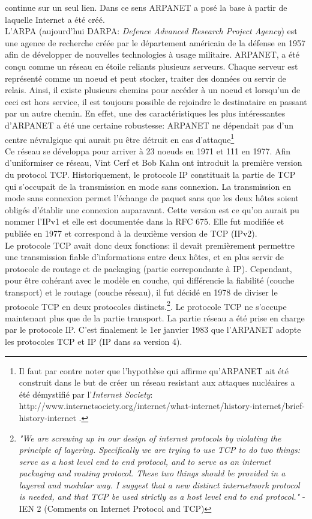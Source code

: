 continue sur un seul lien. Dans ce sens ARPANET a posé la base à partir de 
laquelle Internet a été créé. 
\\
L'ARPA (aujourd'hui DARPA: {\it Defence Advanced Research Project Agency}) est
une agence de recherche créée par le département américain de la défense en
1957 afin de développer de nouvelles technologies à usage militaire. ARPANET,
a été conçu comme un réseau en étoile reliants plusieurs serveurs.
Chaque serveur est représenté comme un noeud et peut stocker, traiter des données ou servir de relais.
Ainsi, il existe plusieurs chemins pour accéder à un noeud et lorsqu'un de ceci
est hors service, il est toujours possible de rejoindre le destinataire
en passant par un autre chemin. En effet, une des caractéristiques les plus intéressantes
d'ARPANET a été une certaine robustesse: ARPANET ne dépendait pas d'un centre
névralgique qui aurait pu être détruit en cas d'attaque\footnote { Il faut par
contre noter que l'hypothèse qui affirme qu'ARPANET ait été construit dans le
but de créer un réseau resistant aux attaques nucléaires a été démystifié par
l'{\it Internet Society}:
http://www.internetsociety.org/internet/what-internet/history-internet/brief-history-internet
.}
\\
Ce réseau se développa pour arriver à 23 noeuds en 1971 et 111 en 1977.
Afin d'uniformiser ce réseau, Vint Cerf et Bob Kahn ont introduit la première
version du protocol TCP.  Historiquement, le protocole IP constituait la
partie de TCP qui s'occupait de la transmission en mode sans connexion.
La transmission en mode sans connexion permet l'échange de paquet sans que les
deux hôtes soient obligés d'établir une connexion auparavant.
Cette version est ce qu'on aurait pu nommer l'IPv1 et elle est documentée dans
la RFC 675. Elle fut modifiée et publiée en 1977 et correspond à la
deuxième version de TCP (IPv2). 
\\
Le protocole TCP avait donc deux fonctions: il devait premièrement
permettre une transmission fiable d'informations entre deux hôtes, et en plus
servir de protocole de routage et de packaging (partie correpondante à IP).
Cependant, pour être cohérant avec le modèle en couche, qui différencie la fiabilité
(couche transport) et le routage (couche réseau), il fut décidé en 1978 de
diviser le protocole TCP en deux protocoles distincts.\footnote {
{\it "We are screwing up in our design of internet protocols by violating the
principle of layering. Specifically we are trying to use TCP to do two
things: serve as a host level end to end protocol, and to serve as an
internet packaging and routing protocol. These two things should be
provided in a layered and modular way. I suggest that a new distinct
internetwork protocol is needed, and that TCP be used strictly as a host
level end to end protocol." } - IEN 2 (Comments on Internet Protocol and TCP)
}.
Le protocole TCP ne s'occupe maintenant plus que de la partie transport. La
partie réseau a été prise en charge par le protocole IP.  C'est finalement le
1er janvier 1983 que l'ARPANET adopte les protocoles TCP et IP (IP dans sa version 4). 

